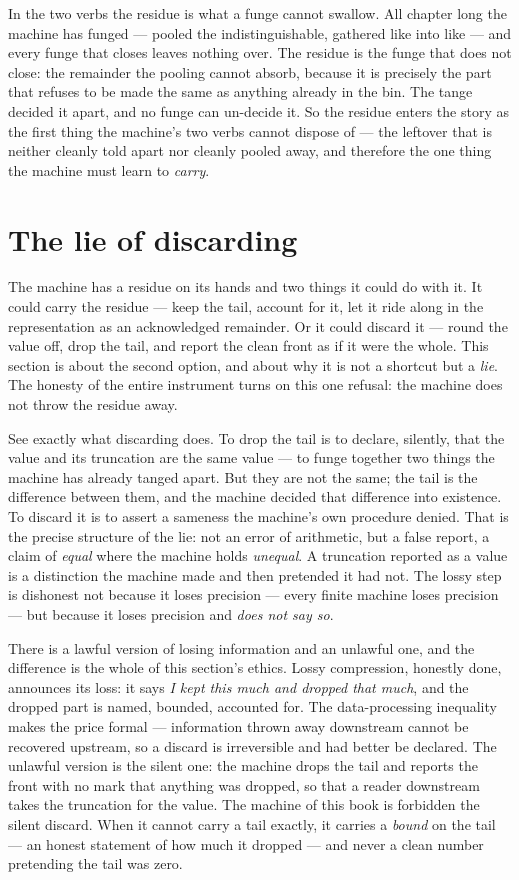 In the two verbs the residue is what a funge cannot swallow. All chapter long the machine has funged --- pooled the
indistinguishable, gathered like into like --- and every funge that closes leaves nothing over. The residue is the
funge that does not close: the remainder the pooling cannot absorb, because it is precisely the part that refuses to be
made the same as anything already in the bin. The tange decided it apart, and no funge can un-decide it. So the residue
enters the story as the first thing the machine's two verbs cannot dispose of --- the leftover that is neither cleanly
told apart nor cleanly pooled away, and therefore the one thing the machine must learn to \emph{carry}.

\section{The lie of discarding}

The machine has a residue on its hands and two things it could do with it. It could carry the residue --- keep the tail,
account for it, let it ride along in the representation as an acknowledged remainder. Or it could discard it --- round
the value off, drop the tail, and report the clean front as if it were the whole. This section is about the second
option, and about why it is not a shortcut but a \emph{lie}. The honesty of the entire instrument turns on this one
refusal: the machine does not throw the residue away.

See exactly what discarding does. To drop the tail is to declare, silently, that the value and its truncation are the
same value --- to funge together two things the machine has already tanged apart. But they are not the same; the tail is
the difference between them, and the machine decided that difference into existence. To discard it is to assert a
sameness the machine's own procedure denied. That is the precise structure of the lie: not an error of arithmetic, but a
false report, a claim of \emph{equal} where the machine holds \emph{unequal}. A truncation reported as a value is a
distinction the machine made and then pretended it had not. The lossy step is dishonest not because it loses precision
--- every finite machine loses precision --- but because it loses precision and \emph{does not say so}.

There is a lawful version of losing information and an unlawful one, and the difference is the whole of this section's
ethics. Lossy compression, honestly done, announces its loss: it says \emph{I kept this much and dropped that much},
and the dropped part is named, bounded, accounted for. The data-processing inequality~\cite{cover2006} makes the price
formal --- information thrown away downstream cannot be recovered upstream, so a discard is irreversible and had better
be declared. The unlawful version is the silent one: the machine drops the tail and reports the front with no mark that
anything was dropped, so that a reader downstream takes the truncation for the value. The machine of this book is
forbidden the silent discard. When it cannot carry a tail exactly, it carries a \emph{bound} on the tail --- an honest
statement of how much it dropped --- and never a clean number pretending the tail was zero.

